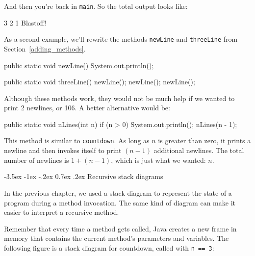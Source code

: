 \documentclass[12pt]{book}
\makeatletter
\theoremstyle{exercise}
\newcommand{\java}[1]{\verb"#1"}
\renewcommand{\section}{\@startsection{section}{1}{\z@}%
    {-3.5ex \@plus -1ex \@minus -.2ex}%
    {0.7ex \@plus.2ex}%
    {\normalfont\Large\bfseries}}
\newcommand{\java}[1]{\lstinline{#1}} %
\makeatother
\begin{document}
And then you're back in \java{main}.
So the total output looks like:

\begin{stdout}
3
2
1
Blastoff!
\end{stdout}

As a second example, we'll rewrite the methods \java{newLine} and \java{threeLine} from Section~\ref{adding_methods}.

\begin{code}
    public static void newLine() {
        System.out.println();
    }

    public static void threeLine() {
        newLine();
        newLine();
        newLine();
    }
\end{code}


Although these methods work, they would not be much help if we wanted to print 2 newlines, or 106.
A better alternative would be:

\begin{code}
    public static void nLines(int n) {
        if (n > 0) {
            System.out.println();
            nLines(n - 1);
        }
    }
\end{code}

This method is similar to \java{countdown}.
As long as $n$ is greater than zero, it prints a newline and then invokes itself to print $(n-1)$ additional newlines.
The total number of newlines is $1 + (n - 1)$, which is just what we wanted: $n$.


\section{Recursive stack diagrams}


In the previous chapter, we used a stack diagram to represent the state of a program during a method invocation.
The same kind of diagram can make it easier to interpret a recursive method.

Remember that every time a method gets called, Java creates a new frame in memory that contains the current method's parameters and variables.
The following figure is a stack diagram for countdown, called with \java{n == 3}:
\end{document}
